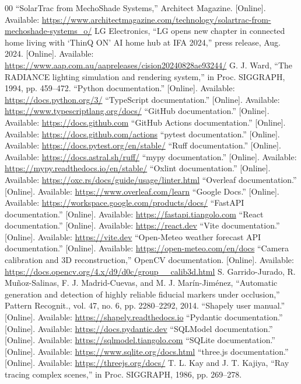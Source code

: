 \documentclass[conference]{IEEEtran}
\begin{document}
\begin{thebibliography}{00}
 ``SolarTrac from MechoShade Systems,'' Architect Magazine. [Online]. Available: \url{https://www.architectmagazine.com/technology/solartrac-from-mechoshade-systems_o/}
 LG Electronics, ``LG opens new chapter in connected home living with `ThinQ ON' AI home hub at IFA 2024,'' press release, Aug. 2024. [Online]. Available: \url{https://www.aap.com.au/aapreleases/cision20240828ae93244/}
 G. J. Ward, ``The RADIANCE lighting simulation and rendering system,'' in Proc. SIGGRAPH, 1994, pp. 459--472.
 ``Python documentation.'' [Online]. Available: \url{https://docs.python.org/3/}
 ``TypeScript documentation.'' [Online]. Available: \url{https://www.typescriptlang.org/docs/}
 ``GitHub documentation.'' [Online]. Available: \url{https://docs.github.com}
 ``GitHub Actions documentation.'' [Online]. Available: \url{https://docs.github.com/actions}
 ``pytest documentation.'' [Online]. Available: \url{https://docs.pytest.org/en/stable/}
 ``Ruff documentation.'' [Online]. Available: \url{https://docs.astral.sh/ruff/}
 ``mypy documentation.'' [Online]. Available: \url{https://mypy.readthedocs.io/en/stable/}
 ``Oxlint documentation.'' [Online]. Available: \url{https://oxc.rs/docs/guide/usage/linter.html}
 ``Overleaf documentation.'' [Online]. Available: \url{https://www.overleaf.com/learn}
 ``Google Docs.'' [Online]. Available: \url{https://workspace.google.com/products/docs/}
 ``FastAPI documentation.'' [Online]. Available: \url{https://fastapi.tiangolo.com}
 ``React documentation.'' [Online]. Available: \url{https://react.dev}
 ``Vite documentation.'' [Online]. Available: \url{https://vite.dev}
 ``Open-Meteo weather forecast API documentation.'' [Online]. Available: \url{https://open-meteo.com/en/docs}
 ``Camera calibration and 3D reconstruction,'' OpenCV documentation. [Online]. Available: \url{https://docs.opencv.org/4.x/d9/d0c/group__calib3d.html}
 S. Garrido-Jurado, R. Mu\~noz-Salinas, F. J. Madrid-Cuevas, and M. J. Mar\'in-Jim\'enez, ``Automatic generation and detection of highly reliable fiducial markers under occlusion,'' Pattern Recognit., vol. 47, no. 6, pp. 2280--2292, 2014.
 ``Shapely user manual.'' [Online]. Available: \url{https://shapely.readthedocs.io}
 ``Pydantic documentation.'' [Online]. Available: \url{https://docs.pydantic.dev}
 ``SQLModel documentation.'' [Online]. Available: \url{https://sqlmodel.tiangolo.com}
 ``SQLite documentation.'' [Online]. Available: \url{https://www.sqlite.org/docs.html}
 ``three.js documentation.'' [Online]. Available: \url{https://threejs.org/docs/}
 T. L. Kay and J. T. Kajiya, ``Ray tracing complex scenes,'' in Proc. SIGGRAPH, 1986, pp. 269--278.
\end{thebibliography}
\end{document}
